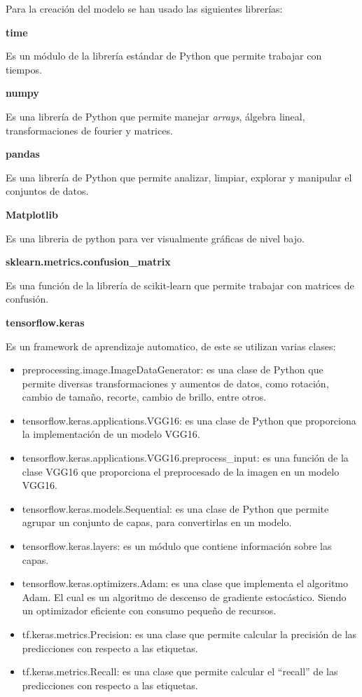         Para la creación del modelo se han usado las siguientes librerías:

        \textbf{time}
        
            Es un módulo de la librería estándar de Python que permite trabajar con tiempos.

        \textbf{numpy}
        
            Es una librería de Python que permite manejar \textit{arrays}, álgebra lineal, transformaciones de fourier y matrices.

        \textbf{pandas}
        
            Es una librería de Python que permite analizar, limpiar, explorar y manipular el conjuntos de datos.

        \textbf{Matplotlib}
        
            Es una libreria de python para ver visualmente gráficas de nivel bajo.

        \textbf{sklearn.metrics.confusion\_matrix}
        
             Es una función de la librería de scikit-learn que permite trabajar con matrices de confusión.

        \textbf{tensorflow.keras}
        
            Es un framework de aprendizaje automatico, de este se utilizan varias clases: 
            \begin{itemize}
                \item preprocessing.image.ImageDataGenerator: es una clase de Python que permite diversas transformaciones y aumentos de datos, como rotación, cambio de tamaño, recorte, cambio de brillo, entre otros.
                \item tensorflow.keras.applications.VGG16: es una clase de Python que proporciona la implementación de un modelo VGG16.
                \item tensorflow.keras.applications.VGG16.preprocess\_input: es una función de la clase VGG16 que proporciona el preprocesado de la imagen en un modelo VGG16.
                \item tensorflow.keras.models.Sequential: es una clase de Python que permite agrupar un conjunto de capas, para convertirlas en un modelo.
                \item tensorflow.keras.layers: es un módulo que contiene información sobre las capas.
                \item tensorflow.keras.optimizers.Adam: es una clase que implementa el algoritmo Adam. El cual es un algoritmo de descenso de gradiente estocástico. Siendo un optimizador eficiente con consumo pequeño de recursos.
                \item tf.keras.metrics.Precision: es una clase que permite calcular la precisión de las predicciones con respecto a las etiquetas.
                \item tf.keras.metrics.Recall: es una clase que permite calcular el ``recall'' de las predicciones con respecto a las etiquetas.  
            \end{itemize}
            
